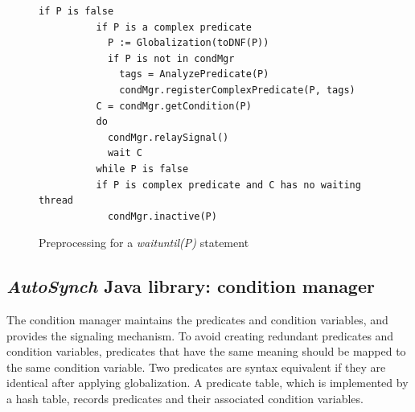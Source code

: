 \documentclass[preprint]{sigplanconf}
\begin{document}
\begin{figure}[ht!]
    \begin{Verbatim}[fontsize=\footnotesize,gobble=8,frame=lines,
            framesep=3mm]
        if P is false 
          if P is a complex predicate 
            P := Globalization(toDNF(P))
            if P is not in condMgr
              tags = AnalyzePredicate(P)
              condMgr.registerComplexPredicate(P, tags)
          C = condMgr.getCondition(P)
          do 
            condMgr.relaySignal()
            wait C
          while P is false
          if P is complex predicate and C has no waiting thread
            condMgr.inactive(P) 
    \end{Verbatim}
    \caption{Preprocessing for a {\em waituntil(P)} statement}
  \label{fig:prep}
\end{figure}  


%
%


\subsection{{\em AutoSynch} Java library: condition manager}
The condition manager maintains the predicates and condition variables, and
provides the signaling mechanism. To avoid creating redundant predicates and 
condition variables, predicates that have the same meaning should be mapped to 
the same condition variable. Two predicates are syntax equivalent if they 
are identical after applying globalization. A predicate table, which is implemented by a
hash table, records predicates and their associated condition variables. 
\end{document}
